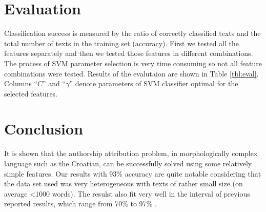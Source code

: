 \documentclass{llncs}
\begin{document}
\section{Evaluation}
\label{sec:evaluacija}
Classification success is measured by the ratio of correctly classified texts and
the total number of texts in the training set (accuracy). First we tested all the
features separately and then we tested those features in different combinations.
The process of SVM parameter selection is very time consuming so not all feature
combinations were tested. Results of the evalutaion are shown in Table
\ref{tbl:eval}. Columns ``$C$'' and ``$\gamma$'' denote parameters of SVM
classifier optimal for the selected features.




% 
% 

\section{Conclusion}
It is shown that the authorship attribution problem, in morphologically complex
language such as the Croatian, can be successfully solved using some relatively
simple features. Our results with 93\% accuracy are quite notable considering
that the data set used was very heterogeneous with texts of rather small
size (on average <1000 words). The resulst also fit very well in the interval of
previous reported results, which range from 70\% to 97\% \cite{coyotl2006authorship,keselj2003n,luyckx2005shallow,stamatatos2001computer}.
\end{document}
